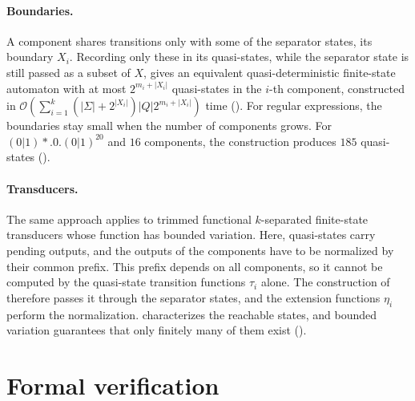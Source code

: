 \paragraph{Boundaries.}
A component shares transitions only with some of the separator states, its boundary $X_i$.
Recording only these in its quasi-states, while the separator state is still passed as a
subset of $X$, gives an equivalent quasi-deterministic finite-state automaton with at most
$2^{m_i + |X_i|}$ quasi-states in the $i$-th component, constructed in
$\mathcal{O}(\sum_{i=1}^k (|\Sigma| + 2^{|X_i|}) |Q| 2^{m_i + |X_i|})$ time
(). For regular expressions, the boundaries stay small when
the number of components grows. For $(0|1)*.0.(0|1)^{20}$ and $16$ components, the
construction produces $185$ quasi-states ().

\paragraph{Transducers.}
The same approach applies to trimmed functional $k$-separated finite-state transducers
whose function has bounded variation. Here, quasi-states carry pending outputs, and the
outputs of the components have to be normalized by their common prefix. This prefix
depends on all components, so it cannot be computed by the quasi-state transition
functions $\tau_i$ alone. The construction of
 therefore passes it through the separator
states, and the extension functions $\eta_i$ perform the normalization.
 characterizes the reachable states, and bounded
variation guarantees that only finitely many of them exist
().

\section{Formal verification}

